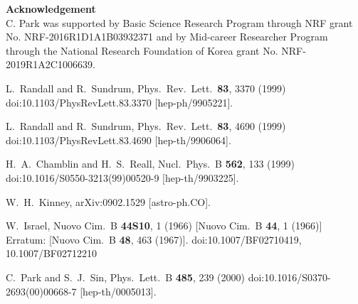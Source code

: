 \documentclass[12pt]{article}
\begin{document}
{\bf \large Acknowledgement} \\
C. Park was supported by Basic Science Research Program through NRF grant No. NRF-2016R1D1A1B03932371 and by Mid-career Researcher Program through the National Research Foundation of Korea grant No. NRF-2019R1A2C1006639.


\vspace{1cm}




\begin{thebibliography}{99}

  L.~Randall and R.~Sundrum,
  Phys.\ Rev.\ Lett.\  {\bf 83}, 3370 (1999)
  doi:10.1103/PhysRevLett.83.3370
  [hep-ph/9905221].
  
  L.~Randall and R.~Sundrum,
  Phys.\ Rev.\ Lett.\  {\bf 83}, 4690 (1999)
  doi:10.1103/PhysRevLett.83.4690
  [hep-th/9906064].
  
  H.~A.~Chamblin and H.~S.~Reall,
  Nucl.\ Phys.\ B {\bf 562}, 133 (1999)
  doi:10.1016/S0550-3213(99)00520-9
  [hep-th/9903225].
  
  W.~H.~Kinney,
  arXiv:0902.1529 [astro-ph.CO].
  
  W.~Israel,
  Nuovo Cim.\ B {\bf 44S10}, 1 (1966)
  [Nuovo Cim.\ B {\bf 44}, 1 (1966)]
  Erratum: [Nuovo Cim.\ B {\bf 48}, 463 (1967)].
  doi:10.1007/BF02710419, 10.1007/BF02712210
  
  C.~Park and S.~J.~Sin,
  Phys.\ Lett.\ B {\bf 485}, 239 (2000)
  doi:10.1016/S0370-2693(00)00668-7
  [hep-th/0005013].
  

\end{thebibliography}
\end{document}
